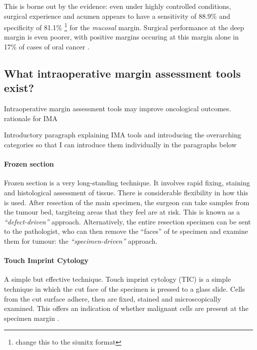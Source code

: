 This is borne out by the evidence: even under highly controlled conditions, surgical experience and acumen appears to have a sensitivity of 88.9\% and specificity of 81.1\% \footnote{change this to the siunitx format} \cite{chaturvedip.GrossExaminationSurgeon2014} for the \emph{mucosal} margin.
Surgical performance at the deep margin is even poorer, with positive margins occuring at this margin alone in 17\% of cases of oral cancer \cite{woolgarHistopathologicalAppraisalSurgical2005}.

\subsection{What intraoperative margin assessment tools exist?}

Intraoperative margin assessment tools may improve oncological outcomes.
rationale for IMA

Introductory paragraph explaining IMA tools and introducing the overarching categories so that I can introduce them individually in the paragraphs below

\paragraph{Frozen section}

Frozen section is a very long-standing technique.
It involves rapid fixing, staining and histological assessment of tissue.
There is considerable flexibility in how this is used.
After resection of the main specimen, the surgeon can take samples from the tumour bed, targiteing areas that they feel are at risk.
This is known as a \emph{``defect-driven''} approach.
Alternatively, the entire resection specimen can be sent to the pathologist, who can then remove the ``faces'' of te specimen and examine them for tumour: the \emph{``specimen-driven''} approach.

\paragraph{Touch Imprint Cytology}
A simple but effective technique. 
Touch imprint cytology (TIC) is a simple technique in which the cut face of the specimen is pressed to a glass slide. 
Cells from the cut surface adhere, then are fixed, stained and microscopically examined. 
This offers an indication of whether malignant cells are present at the specimen margin \cite{naveedDiagnosticAccuracyTouch2017}.


